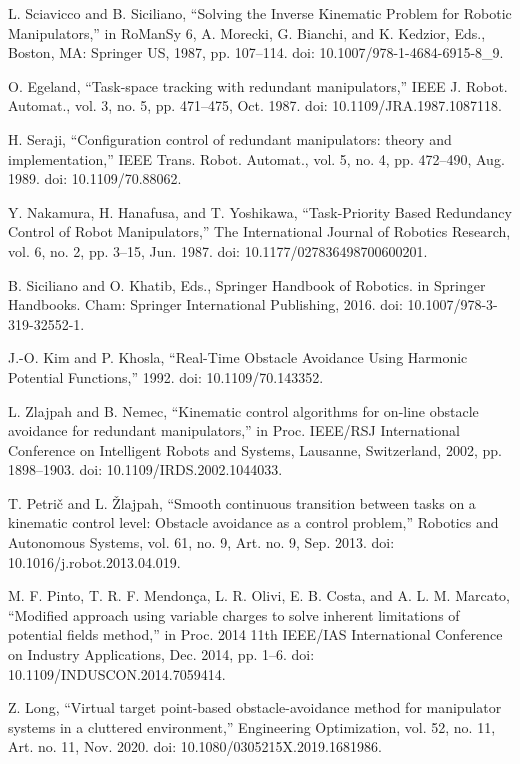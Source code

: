 \documentclass[letterpaper, 10 pt, conference]{ieeeconf}  %
\begin{document}
\begin{thebibliography}{99}
 L. Sciavicco and B. Siciliano, “Solving the Inverse Kinematic Problem for Robotic Manipulators,” in RoManSy 6, A. Morecki, G. Bianchi, and K. Kedzior, Eds., Boston, MA: Springer US, 1987, pp. 107–114. doi: 10.1007/978-1-4684-6915-8\_9.

 O. Egeland, “Task-space tracking with redundant manipulators,” IEEE J. Robot. Automat., vol. 3, no. 5, pp. 471–475, Oct. 1987. doi: 10.1109/JRA.1987.1087118.

 H. Seraji, “Configuration control of redundant manipulators: theory and implementation,” IEEE Trans. Robot. Automat., vol. 5, no. 4, pp. 472–490, Aug. 1989. doi: 10.1109/70.88062.

 Y. Nakamura, H. Hanafusa, and T. Yoshikawa, “Task-Priority Based Redundancy Control of Robot Manipulators,” The International Journal of Robotics Research, vol. 6, no. 2, pp. 3–15, Jun. 1987. doi: 10.1177/027836498700600201.

 B. Siciliano and O. Khatib, Eds., Springer Handbook of Robotics. in Springer Handbooks. Cham: Springer International Publishing, 2016. doi: 10.1007/978-3-319-32552-1.

 J.-O. Kim and P. Khosla, “Real-Time Obstacle Avoidance Using Harmonic Potential Functions,” 1992. doi: 10.1109/70.143352.

 L. Zlajpah and B. Nemec, “Kinematic control algorithms for on-line obstacle avoidance for redundant manipulators,” in Proc. IEEE/RSJ International Conference on Intelligent Robots and Systems, Lausanne, Switzerland, 2002, pp. 1898–1903. doi: 10.1109/IRDS.2002.1044033.

 T. Petrič and L. Žlajpah, “Smooth continuous transition between tasks on a kinematic control level: Obstacle avoidance as a control problem,” Robotics and Autonomous Systems, vol. 61, no. 9, Art. no. 9, Sep. 2013. doi: 10.1016/j.robot.2013.04.019.

 M. F. Pinto, T. R. F. Mendonça, L. R. Olivi, E. B. Costa, and A. L. M. Marcato, “Modified approach using variable charges to solve inherent limitations of potential fields method,” in Proc. 2014 11th IEEE/IAS International Conference on Industry Applications, Dec. 2014, pp. 1–6. doi: 10.1109/INDUSCON.2014.7059414.

 Z. Long, “Virtual target point-based obstacle-avoidance method for manipulator systems in a cluttered environment,” Engineering Optimization, vol. 52, no. 11, Art. no. 11, Nov. 2020. doi: 10.1080/0305215X.2019.1681986.


\end{thebibliography}
\end{document}
